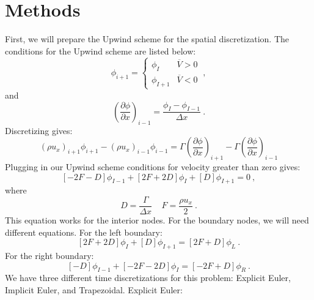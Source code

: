 \documentclass[12pt]{article}
\begin{document}
\section{Methods}
First, we will prepare the Upwind scheme for the spatial discretization. The conditions for the Upwind scheme are listed below:
\begin{equation*}
    \phi_{i+1} = \begin{cases}
                    \phi_{I} & \overline{V} > 0\\
                    \phi_{I+1} & \overline{V} < 0
                 \end{cases}\:,
\end{equation*}
and
\begin{equation}
    \left(\frac{\partial \phi}{\partial x}\right)_{i-1} = \frac{\phi_{I} - \phi_{I-1}}{\Delta x}\:.
\end{equation}
Discretizing gives:
\begin{equation*}
    \left( \rho u_x \right)_{i+1} \phi_{i+1} - \left( \rho u_x \right)_{i-1} \phi_{i-1} = \Gamma \left( \frac{\partial \phi}{\partial x} \right)_{i+1} - \Gamma \left( \frac{\partial \phi}{\partial x} \right)_{i-1}
\end{equation*}
Plugging in our Upwind scheme conditions for velocity greater than zero gives:
\begin{equation*}
    \left[-2F - D  \right] \phi_{I-1} + \left[ 2F + 2D \right] \phi_{I} + \left[ D \right] \phi_{I+1} = 0\:,
\end{equation*}
where
\begin{equation*}
    D = \frac{\Gamma}{\Delta x} ~~~~~ F = \frac{\rho u_x}{2}\:.
\end{equation*}
This equation works for the interior nodes. For the boundary nodes, we will need different equations. For the left boundary:
\begin{equation*}
    \left[ 2F + 2D \right] \phi_{I} + \left[ D \right] \phi_{I+1} = \left[ 2F + D \right] \phi_{L}\:.
\end{equation*}
For the right boundary:
\begin{equation*}
    \left[ -D \right] \phi_{I-1} + \left[ -2F - 2D \right] \phi_{I} = \left[ -2F + D \right] \phi_{R}\:.
\end{equation*}
We have three different time discretizations for this problem: Explicit Euler, Implicit Euler, and Trapezoidal.
Explicit Euler:
\end{document}
